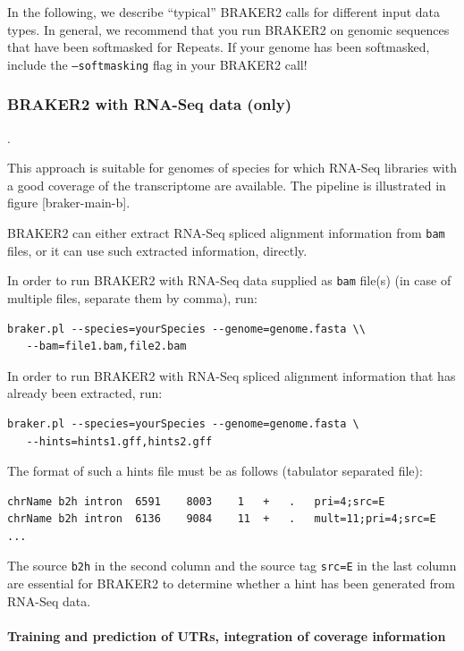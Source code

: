 \documentclass[]{article}
\let\oldparagraph\paragraph
\renewcommand{\paragraph}[1]{\oldparagraph{#1}\mbox{}}
\begin{document}
In the following, we describe ``typical'' BRAKER2 calls for different
input data types. In general, we recommend that you run BRAKER2 on
genomic sequences that have been softmasked for Repeats. If your genome
has been softmasked, include the \texttt{–softmasking} flag in your
BRAKER2 call!

\hypertarget{braker1}{\subsubsection{BRAKER2 with RNA-Seq data
(only)}\label{braker1}}

.

This approach is suitable for genomes of species for which RNA-Seq
libraries with a good coverage of the transcriptome are available. The
pipeline is illustrated in figure {[}braker-main-b{]}.

BRAKER2 can either extract RNA-Seq spliced alignment information from
\texttt{bam} files, or it can use such extracted information, directly.

In order to run BRAKER2 with RNA-Seq data supplied as \texttt{bam}
file(s) (in case of multiple files, separate them by comma), run:

\begin{verbatim}
braker.pl --species=yourSpecies --genome=genome.fasta \\
   --bam=file1.bam,file2.bam
\end{verbatim}

In order to run BRAKER2 with RNA-Seq spliced alignment information that
has already been extracted, run:

\begin{verbatim}
braker.pl --species=yourSpecies --genome=genome.fasta \
   --hints=hints1.gff,hints2.gff
\end{verbatim}

The format of such a hints file must be as follows (tabulator separated
file):

\begin{verbatim}
chrName b2h intron  6591    8003    1   +   .   pri=4;src=E
chrName b2h intron  6136    9084    11  +   .   mult=11;pri=4;src=E
...
\end{verbatim}

The source \texttt{b2h} in the second column and the source tag
\texttt{src=E} in the last column are essential for BRAKER2 to determine
whether a hint has been generated from RNA-Seq data.

\paragraph{Training and prediction of UTRs, integration of coverage
information}\label{training-and-prediction-of-utrs-integration-of-coverage-information}
\end{document}
